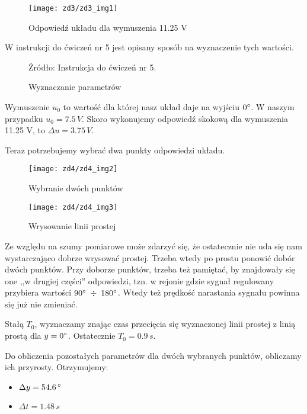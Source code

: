 \documentclass[11 pt]{article}
\begin{document}
\begin{figure}[h!]
	\center
	\texttt{[image: zd3/zd3\_img1]}
	\caption{Odpowiedź układu dla wymuszenia 11.25 V}
\end{figure}

W instrukcji do ćwiczeń nr 5 jest opisany sposób na wyznaczenie tych wartości.

\begin{figure}[h!]
	\center
	\caption{Wyznaczanie parametrów}
	Źródło: Instrukcja do ćwiczeń nr 5.
\end{figure}

\newpage

Wymuszenie $u_0$ to wartość dla której nasz układ daje na wyjściu $0 \degree$. W naszym przypadku $u_0 = 7.5 \, V$. Skoro wykonujemy odpowiedź skokową dla wymuszenia 11.25 V, to $\Delta u = 3.75 \, V$.

Teraz potrzebujemy wybrać dwa punkty odpowiedzi układu.

\begin{figure}[h!]
	\center
	\texttt{[image: zd4/zd4\_img2]}
	\caption{Wybranie dwóch punktów}
\end{figure}

\begin{figure}[h!]
	\center
	\texttt{[image: zd4/zd4\_img3]}
	\caption{Wrysowanie linii prostej}
\end{figure}

Ze względu na szumy pomiarowe może zdarzyć się, że ostatecznie nie uda się nam wystarczająco dobrze wrysować prostej. Trzeba wtedy po prostu ponowić dobór dwóch punktów. Przy doborze punktów, trzeba też pamiętać, by znajdowały się one ,,w drugiej części'' odpowiedzi, tzn. w rejonie gdzie sygnał regulowany przybiera wartości $90 \degree \; \div \; 180 \degree$. Wtedy też prędkość narastania sygnału powinna się już nie zmieniać.

\newpage

Stałą $T_0$, wyznaczamy znając czas przecięcia się wyznaczonej linii prostej z linią prostą dla $y = 0 \degree$. Ostatecznie $T_0 = 0.9 \, s$.

Do obliczenia pozostałych parametrów dla dwóch wybranych punktów, obliczamy ich przyrosty. Otrzymujemy:

\begin{itemize}
\item[] $\Delta y = 54.6 \, \degree$
\item[] $\Delta t = 1.48 \, s$
\end{itemize}
\end{document}
